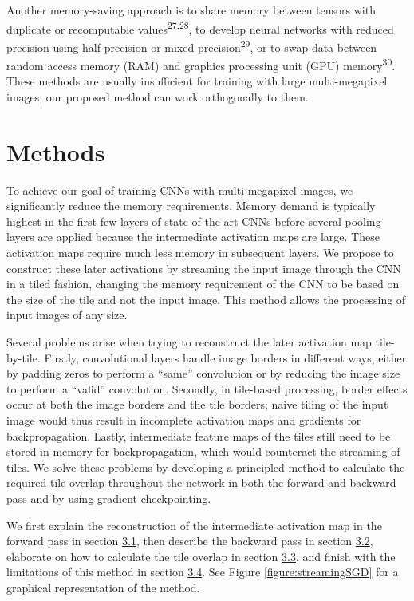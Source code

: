 \documentclass[
  12pt,
  a5,margin=2cmpaper,
]{article}
\begin{document}
Another memory-saving approach is to share memory between tensors with
duplicate or recomputable values\textsuperscript{27,28}, to develop
neural networks with reduced precision using half-precision or mixed
precision\textsuperscript{29}, or to swap data between random access
memory (RAM) and graphics processing unit (GPU)
memory\textsuperscript{30}. These methods are usually insufficient for
training with large multi-megapixel images; our proposed method can work
orthogonally to them.

\hypertarget{methods}{%
\section{Methods}\label{methods}}

To achieve our goal of training CNNs with multi-megapixel images, we
significantly reduce the memory requirements. Memory demand is typically
highest in the first few layers of state-of-the-art CNNs before several
pooling layers are applied because the intermediate activation maps are
large. These activation maps require much less memory in subsequent
layers. We propose to construct these later activations by streaming the
input image through the CNN in a tiled fashion, changing the memory
requirement of the CNN to be based on the size of the tile and not the
input image. This method allows the processing of input images of any
size.

Several problems arise when trying to reconstruct the later activation
map tile-by-tile. Firstly, convolutional layers handle image borders in
different ways, either by padding zeros to perform a ``same''
convolution or by reducing the image size to perform a ``valid''
convolution. Secondly, in tile-based processing, border effects occur at
both the image borders and the tile borders; naive tiling of the input
image would thus result in incomplete activation maps and gradients for
backpropagation. Lastly, intermediate feature maps of the tiles still
need to be stored in memory for backpropagation, which would counteract
the streaming of tiles. We solve these problems by developing a
principled method to calculate the required tile overlap throughout the
network in both the forward and backward pass and by using gradient
checkpointing.

We first explain the reconstruction of the intermediate activation map
in the forward pass in section \protect\hyperlink{forwardpass}{3.1},
then describe the backward pass in section
\protect\hyperlink{backwardpass}{3.2}, elaborate on how to calculate the
tile overlap in section \protect\hyperlink{calculateoverlap}{3.3}, and
finish with the limitations of this method in section
\protect\hyperlink{limitations}{3.4}. See Figure
\protect\hyperlink{figure:streamingSGD}{{[}figure:streamingSGD{]}} for a
graphical representation of the method.
\end{document}
